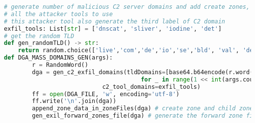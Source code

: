 \documentclass [11pt, proquest] {uwthesis}[2020/02/24]
\begin{document}
{\footnotesize
\begin{lstlisting}[language=Python, 
    caption={Domain Generation Algorithm}, 
    label={lst:dga},
    aboveskip=0.5em,
    belowskip=0.5em
]
# generate number of malicious C2 server domains and add create zones, child zones NS links inside DNS server
# all the attacker tools to use 
# this attacker tool also generate the third label of C2 domain
exfil_tools: List[str] = ['dnscat', 'sliver', 'iodine', 'det']
# get the random TLD
def gen_randomTLD() -> str:
    return random.choice(['live','com','de','io','se','bld', 'val', 'def', 'head'])
def DGA_MASS_DOMAINS_GEN(args):
        r = RandomWord()
        dga = gen_c2_exfil_domains(tldDomains=[base64.b64encode(r.word()).lower() + "." + gen_randomTLD()
                                       for _ in range(1 << int(args.count))], 
                            c2_tool_domains=exfil_tools)
        ff = open(DGA_FILE, 'w', encoding='utf-8')
        ff.write('\n'.join(dga))
        append_zone_data_in_zoneFiles(dga) # create zone and child zones for PowerDNS Authoritative zone
        gen_exil_forward_zones_file(dga) # generate the forward zone file for PowerDNS Recursor
\end{lstlisting}
}
\end{document}
